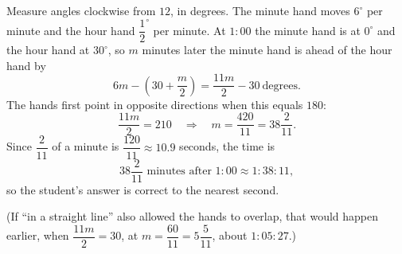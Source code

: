 Measure angles clockwise from $12$, in degrees. The minute hand moves $6^\circ$ per minute and the hour hand $\dfrac{1}{2}^\circ$ per minute. At $1{:}00$ the minute hand is at $0^\circ$ and the hour hand at $30^\circ$, so $m$ minutes later the minute hand is ahead of the hour hand by
\[6m-\left(30+\dfrac {m}{2}\right)=\dfrac{11m}{2}-30\ \text{degrees}.\]
The hands first point in opposite directions when this equals $180$:
\[\dfrac{11m}{2}=210\quad\Longrightarrow\quad m=\dfrac{420}{11}=38\dfrac{2}{11}.\]
Since $\dfrac{2}{11}$ of a minute is $\dfrac{120}{11}\approx10.9$ seconds, the time is
\[\boxed{38\dfrac{2}{11}\text{ minutes after }1{:}00}\approx1{:}38{:}11,\]
so the student's answer is correct to the nearest second.

(If ``in a straight line'' also allowed the hands to overlap, that would happen earlier, when $\dfrac{11m}{2}=30$, at $m=\dfrac{60}{11}=5\dfrac{5}{11}$, about $1{:}05{:}27$.)
